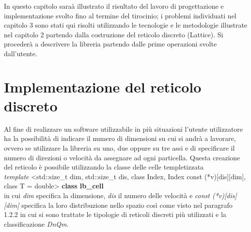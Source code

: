 \large {
In questo capitolo sara\`a illustrato il risultato del lavoro di progettazione e implementazione svolto fino al termine del tirocinio; i problemi individuati nel capitolo 3 sono stati qui risolti utilizzando le tecnologie e le metodologie illustrate nel capitolo 2 partendo dalla costruzione del reticolo discreto (Lattice). Si proceder\`a a descrivere la libreria partendo dalle prime operazioni svolte dall'utente.

\section{Implementazione del reticolo discreto}
Al fine di realizzare un software utilizzabile in pi\`u situazioni l'utente utilizzatore ha la possibilit\`a di indicare il numero di dimensioni su cui si andr\`a a lavorare, ovvero se utilizzare la libreria su uno, due oppure su tre assi e di specificare il numero di direzioni o velocit\`a da assegnare ad ogni particella. Questa creazione del reticolo \`e possibile utilizzando la classe delle celle templetizzata \\
    \textit{template} <std::size\_t dim, std::size\_t dis, class Index, Index const (*v)[dis][dim], class T = double> \textbf{class lb\_cell}\\
in cui \textit{dim} specifica la dimensione, \textit{dis} il numero delle velocit\`a e \textit{const (*v)[dis][dim]} specifica la loro distribuzione nello spazio cos\`i come visto nel paragrafo 1.2.2 in cui si sono trattate le tipologie di reticoli discreti pi\`u utilizzati e la classificazione \textit{DnQm}.

}
